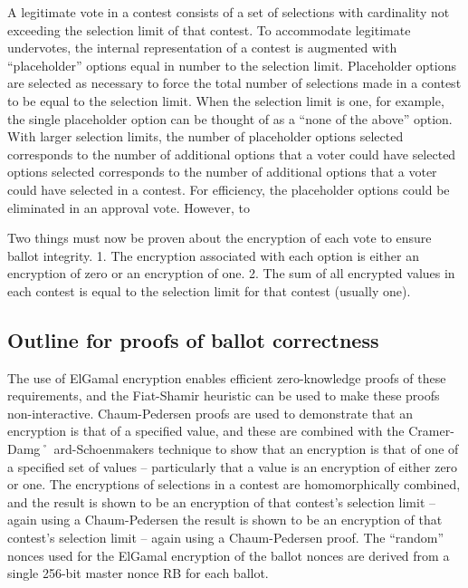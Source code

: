 A legitimate vote in a contest consists of a set of selections with cardinality not exceeding the selection limit of
that contest. To accommodate legitimate undervotes, the internal representation of a contest is augmented with
“placeholder” options equal in number to the selection limit. Placeholder options are selected as necessary to force the
total number of selections made in a contest to be equal to the selection limit. When the selection limit is one, for
example, the single placeholder option can be thought of as a “none of the above” option. With larger selection limits,
the number of placeholder options selected corresponds to the number of additional options that a voter could have
selected
\cite[12]{eg-spec}
options selected corresponds to the number of additional options that a voter could have selected in a contest. For
efficiency, the placeholder options could be eliminated in an approval vote. However, to
\cite[12]{eg-spec}

Two things must now be proven about the encryption of each vote to ensure ballot integrity. 1. The encryption associated
with each option is either an encryption of zero or an encryption of one. 2. The sum of all encrypted values in each
contest is equal to the selection limit for that contest (usually one).
\cite[12]{eg-spec}

\subsection{Outline for proofs of ballot correctness}

The use of ElGamal encryption enables efficient zero-knowledge proofs of these requirements, and the Fiat-Shamir
heuristic can be used to make these proofs non-interactive. Chaum-Pedersen proofs are used to demonstrate that an
encryption is that of a specified value, and these are combined with the Cramer-Damg˚ ard-Schoenmakers technique to show
that an encryption is that of one of a specified set of values – particularly that a value is an encryption of either
zero or one. The encryptions of selections in a contest are homomorphically combined, and the result is shown to be an
encryption of that contest’s selection limit – again using a Chaum-Pedersen
\cite[13]{eg-spec}
the result is shown to be an encryption of that contest’s selection limit – again using a Chaum-Pedersen proof.
\cite[13]{eg-spec}
The “random” nonces used for the ElGamal encryption of the ballot nonces are derived from a single 256-bit master nonce
RB for each ballot.
\cite[13]{eg-spec}

